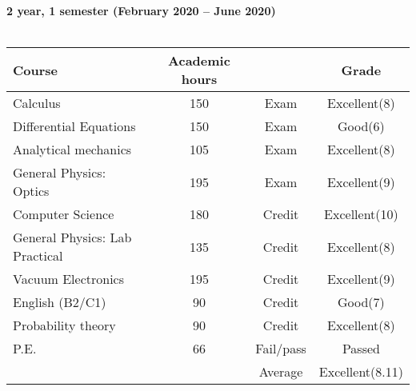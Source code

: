 \documentclass[a4paper]{article}
\newcommand{\upperRomannumeral}[1]{\uppercase\expandafter{\romannumeral#1}}
\begin{document}
\textbf{2 year, 1 semester (February 2020 -- June 2020)}\\ \\
\begin{tabular}{|p{6cm}|c|c|c|}
\hline
\textbf{Course}&\textbf{Academic hours}& &\textbf{Grade}\\
\hline
Calculus \upperRomannumeral{4} & 150 & Exam & Excellent(8)\\

Differential Equations & 150 & Exam & Good(6)\\

Analytical mechanics & 105 & Exam & Excellent(8)\\

General Physics: Optics & 195 & Exam & Excellent(9)\\

Computer Science & 180 & Credit & Excellent(10)\\

General Physics: Lab Practical & 135 & Credit & Excellent(8)\\

Vacuum Electronics & 195 & Credit & Excellent(9)\\

English (B2/C1) & 90 & Credit & Good(7)\\

Probability theory & 90 & Credit & Excellent(8) \\

P.E.& 66 & Fail/pass & Passed \\
\hline
&& Average & Excellent(8.11)\\
\hline
\end{tabular}\\ \\
\end{document}
